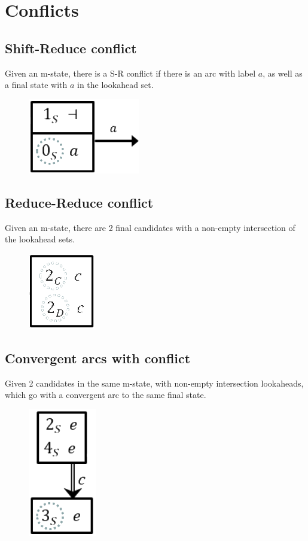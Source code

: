 \section{Conflicts}
\subsection{Shift-Reduce conflict}
Given an m-state, there is a S-R conflict if there is an arc with label $a$, as well as a final state with $a$ in the lookahead set.
\begin{figure}[H]
    \centering
    \includegraphics[width=0.2\linewidth]{parsing/shift-reduce-conflict.png}
\end{figure}

\subsection{Reduce-Reduce conflict}
Given an m-state, there are 2 final candidates with a non-empty intersection of the lookahead sets.
\begin{figure}[H]
    \centering
    \includegraphics[width=0.15\linewidth]{parsing/reduce-reduce-conflict.png}
\end{figure}

\subsection{Convergent arcs with conflict}
Given 2 candidates in the same m-state, with non-empty intersection lookaheads, which go with a convergent arc to the same final state.
\begin{figure}[H]
    \centering
    \includegraphics[width=0.15\linewidth]{parsing/convergent-conflict.png}
\end{figure}
